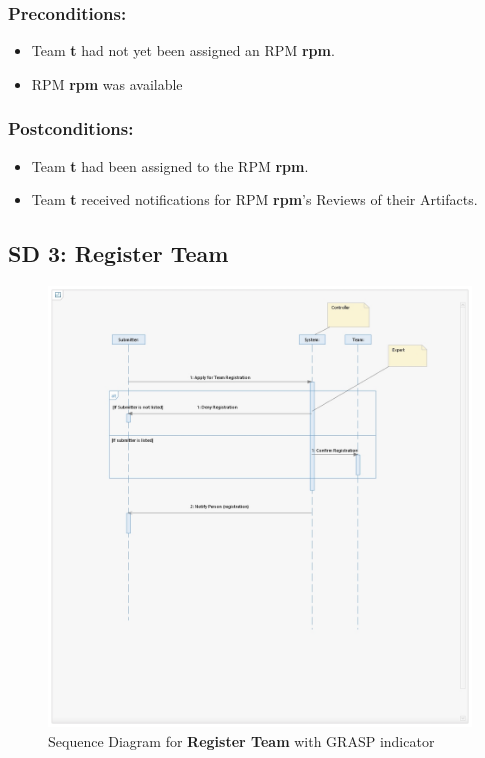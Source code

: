 \subsubsection*{Preconditions:}
\begin{itemize}
\itemsep-1.5em 
    \item Team \textbf{t} had not yet been assigned an RPM \textbf{rpm}.
    \item RPM \textbf{rpm} was available
\end{itemize}



\subsubsection*{Postconditions:}
\begin{itemize}
\itemsep-1.5em 
    \item Team \textbf{t} had been assigned to the RPM \textbf{rpm}.
    \item Team \textbf{t} received notifications for RPM \textbf{rpm}’s Reviews of their Artifacts.
\end{itemize}







\subsection*{SD 3: Register Team}

\begin{figure}[h]
\includegraphics[width=13cm]{SD_RegisterTeam.jpeg}
\centering
\caption{Sequence Diagram for \textbf{Register Team} with GRASP indicator}
\end{figure}



